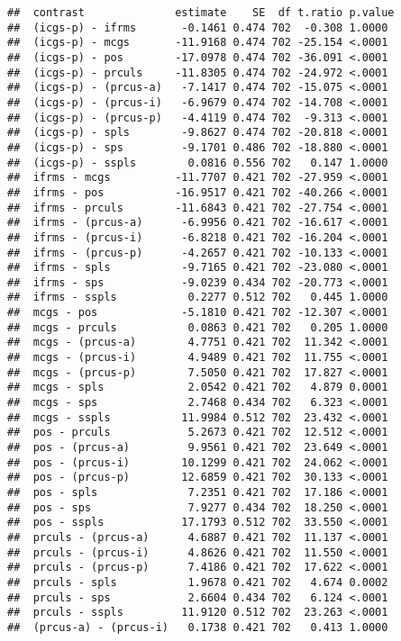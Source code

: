 \documentclass[
]{article}
\begin{document}
\begin{verbatim}
##  contrast              estimate    SE  df t.ratio p.value
##  (icgs-p) - ifrms       -0.1461 0.474 702  -0.308 1.0000 
##  (icgs-p) - mcgs       -11.9168 0.474 702 -25.154 <.0001 
##  (icgs-p) - pos        -17.0978 0.474 702 -36.091 <.0001 
##  (icgs-p) - prculs     -11.8305 0.474 702 -24.972 <.0001 
##  (icgs-p) - (prcus-a)   -7.1417 0.474 702 -15.075 <.0001 
##  (icgs-p) - (prcus-i)   -6.9679 0.474 702 -14.708 <.0001 
##  (icgs-p) - (prcus-p)   -4.4119 0.474 702  -9.313 <.0001 
##  (icgs-p) - spls        -9.8627 0.474 702 -20.818 <.0001 
##  (icgs-p) - sps         -9.1701 0.486 702 -18.880 <.0001 
##  (icgs-p) - sspls        0.0816 0.556 702   0.147 1.0000 
##  ifrms - mcgs          -11.7707 0.421 702 -27.959 <.0001 
##  ifrms - pos           -16.9517 0.421 702 -40.266 <.0001 
##  ifrms - prculs        -11.6843 0.421 702 -27.754 <.0001 
##  ifrms - (prcus-a)      -6.9956 0.421 702 -16.617 <.0001 
##  ifrms - (prcus-i)      -6.8218 0.421 702 -16.204 <.0001 
##  ifrms - (prcus-p)      -4.2657 0.421 702 -10.133 <.0001 
##  ifrms - spls           -9.7165 0.421 702 -23.080 <.0001 
##  ifrms - sps            -9.0239 0.434 702 -20.773 <.0001 
##  ifrms - sspls           0.2277 0.512 702   0.445 1.0000 
##  mcgs - pos             -5.1810 0.421 702 -12.307 <.0001 
##  mcgs - prculs           0.0863 0.421 702   0.205 1.0000 
##  mcgs - (prcus-a)        4.7751 0.421 702  11.342 <.0001 
##  mcgs - (prcus-i)        4.9489 0.421 702  11.755 <.0001 
##  mcgs - (prcus-p)        7.5050 0.421 702  17.827 <.0001 
##  mcgs - spls             2.0542 0.421 702   4.879 0.0001 
##  mcgs - sps              2.7468 0.434 702   6.323 <.0001 
##  mcgs - sspls           11.9984 0.512 702  23.432 <.0001 
##  pos - prculs            5.2673 0.421 702  12.512 <.0001 
##  pos - (prcus-a)         9.9561 0.421 702  23.649 <.0001 
##  pos - (prcus-i)        10.1299 0.421 702  24.062 <.0001 
##  pos - (prcus-p)        12.6859 0.421 702  30.133 <.0001 
##  pos - spls              7.2351 0.421 702  17.186 <.0001 
##  pos - sps               7.9277 0.434 702  18.250 <.0001 
##  pos - sspls            17.1793 0.512 702  33.550 <.0001 
##  prculs - (prcus-a)      4.6887 0.421 702  11.137 <.0001 
##  prculs - (prcus-i)      4.8626 0.421 702  11.550 <.0001 
##  prculs - (prcus-p)      7.4186 0.421 702  17.622 <.0001 
##  prculs - spls           1.9678 0.421 702   4.674 0.0002 
##  prculs - sps            2.6604 0.434 702   6.124 <.0001 
##  prculs - sspls         11.9120 0.512 702  23.263 <.0001 
##  (prcus-a) - (prcus-i)   0.1738 0.421 702   0.413 1.0000 

\end{verbatim}
\end{document}
